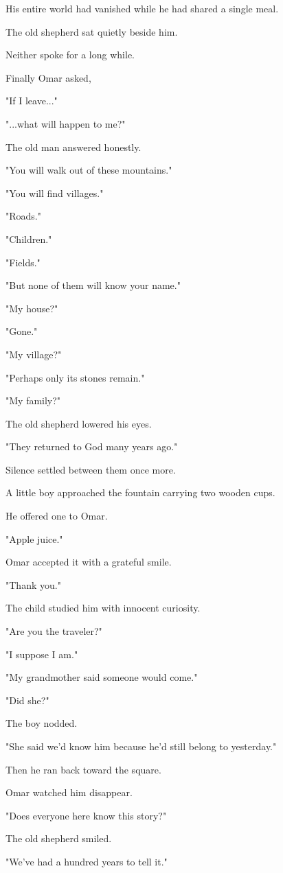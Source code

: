 \documentclass[12pt,openany]{book}
\begin{document}
His entire world had vanished while he had shared a single meal.

The old shepherd sat quietly beside him.

Neither spoke for a long while.

Finally Omar asked,

"If I leave..."

"...what will happen to me?"

The old man answered honestly.

"You will walk out of these mountains."

"You will find villages."

"Roads."

"Children."

"Fields."

"But none of them will know your name."

"My house?"

"Gone."

"My village?"

"Perhaps only its stones remain."

"My family?"

The old shepherd lowered his eyes.

"They returned to God many years ago."

Silence settled between them once more.

A little boy approached the fountain carrying two wooden cups.

He offered one to Omar.

"Apple juice."

Omar accepted it with a grateful smile.

"Thank you."

The child studied him with innocent curiosity.

"Are you the traveler?"

"I suppose I am."

"My grandmother said someone would come."

"Did she?"

The boy nodded.

"She said we'd know him because he'd still belong to yesterday."

Then he ran back toward the square.

Omar watched him disappear.

"Does everyone here know this story?"

The old shepherd smiled.

"We've had a hundred years to tell it."
\end{document}
